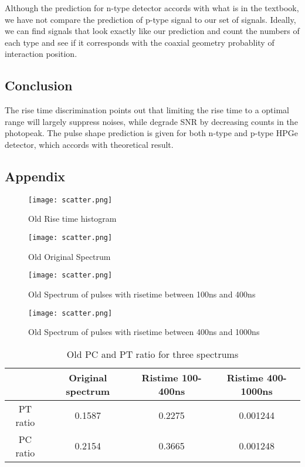 Although the prediction for n-type detector accords with what is in the textbook, we have not compare the prediction of p-type signal to our set of signals. Ideally, we can find signals that look exactly like our prediction and count the numbers of each type and see if it corresponds with the coaxial geometry probablity of interaction position. 

\subsection{Conclusion}
The rise time discrimination points out that limiting the rise time to a optimal range will largely suppress noises, while degrade SNR by decreasing counts in the photopeak. The pulse shape prediction is given for both n-type and p-type HPGe detector, which accords with theoretical result.
\clearpage
\subsection*{Appendix}
\begin{figure}[h!]
\begin{center}
\texttt{[image: scatter.png]}
\caption{Old Rise time histogram}
\label{old}
\end{center}
\end{figure}
\begin{figure}[h!]
\begin{center}
\texttt{[image: scatter.png]}
\caption{Old Original Spectrum}

\end{center}
\end{figure}
\begin{figure}[h!]
\begin{center}
\texttt{[image: scatter.png]}
\caption{Old Spectrum of pulses with risetime between 100ns and 400ns}

\end{center}
\end{figure}

\begin{figure}[h!]
\begin{center}
\texttt{[image: scatter.png]}
\caption{Old Spectrum of pulses with risetime between 400ns and 1000ns}
\end{center}
\end{figure}
\clearpage
\begin{table}[h!]
\begin{center}
\caption{Old PC and PT ratio for three spectrums}
\begin{tabular}{| c | c | c | c |}
\hline

	&\textbf{Original spectrum}  & \textbf{Ristime 100-400ns} & \textbf{Ristime 400-1000ns}\\\hline
	
PT ratio  	&0.1587		&0.2275		&0.001244 \\\hline

PC ratio	&0.2154		&0.3665		&0.001248 \\\hline

\end{tabular}

\end{center}
\end{table}
